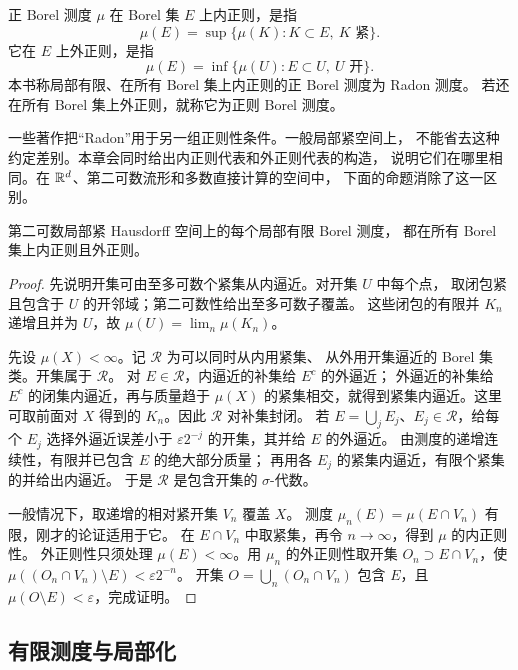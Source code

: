 \begin{definition}\label{def:radon-measure}
正 Borel 测度 \(\mu\) 在 Borel 集 \(E\) 上内正则，是指
\[
 \mu(E)=\sup\{\mu(K):K\subset E,\ K\text{ 紧}\}.
\]
它在 \(E\) 上外正则，是指
\[
 \mu(E)=\inf\{\mu(U):E\subset U,\ U\text{ 开}\}.
\]
本书称局部有限、在所有 Borel 集上内正则的正 Borel 测度为 Radon 测度。
若还在所有 Borel 集上外正则，就称它为正则 Borel 测度。
\end{definition}

一些著作把“Radon”用于另一组正则性条件。一般局部紧空间上，
不能省去这种约定差别。本章会同时给出内正则代表和外正则代表的构造，
说明它们在哪里相同。在 \(\mathbb{R}^d\)、第二可数流形和多数直接计算的空间中，
下面的命题消除了这一区别。

\begin{proposition}\label{prop:radon-second-countable-regular}
第二可数局部紧 Hausdorff 空间上的每个局部有限 Borel 测度，
都在所有 Borel 集上内正则且外正则。
\end{proposition}
\begin{proof}
先说明开集可由至多可数个紧集从内逼近。对开集 \(U\) 中每个点，
取闭包紧且包含于 \(U\) 的开邻域；第二可数性给出至多可数子覆盖。
这些闭包的有限并 \(K_n\) 递增且并为 \(U\)，故
\(\mu(U)=\lim_n\mu(K_n)\)。

先设 \(\mu(X)<\infty\)。记 \(\mathcal R\) 为可以同时从内用紧集、
从外用开集逼近的 Borel 集类。开集属于 \(\mathcal R\)。
对 \(E\in\mathcal R\)，内逼近的补集给 \(E^c\) 的外逼近；
外逼近的补集给 \(E^c\) 的闭集内逼近，再与质量趋于
\(\mu(X)\) 的紧集相交，就得到紧集内逼近。这里可取前面对 \(X\)
得到的 \(K_n\)。因此 \(\mathcal R\) 对补集封闭。
若 \(E=\bigcup_j E_j\)、\(E_j\in\mathcal R\)，给每个 \(E_j\)
选择外逼近误差小于 \(\varepsilon2^{-j}\) 的开集，其并给 \(E\) 的外逼近。
由测度的递增连续性，有限并已包含 \(E\) 的绝大部分质量；
再用各 \(E_j\) 的紧集内逼近，有限个紧集的并给出内逼近。
于是 \(\mathcal R\) 是包含开集的 \(\sigma\)-代数。

一般情况下，取递增的相对紧开集 \(V_n\) 覆盖 \(X\)。
测度 \(\mu_n(E)=\mu(E\cap V_n)\) 有限，刚才的论证适用于它。
在 \(E\cap V_n\) 中取紧集，再令 \(n\to\infty\)，得到 \(\mu\) 的内正则性。
外正则性只须处理 \(\mu(E)<\infty\)。用 \(\mu_n\) 的外正则性取开集
\(O_n\supset E\cap V_n\)，使
\(\mu((O_n\cap V_n)\setminus E)<\varepsilon2^{-n}\)。
开集 \(O=\bigcup_n(O_n\cap V_n)\) 包含 \(E\)，且
\(\mu(O\setminus E)<\varepsilon\)，完成证明。
\end{proof}

\subsection{有限测度与局部化}

